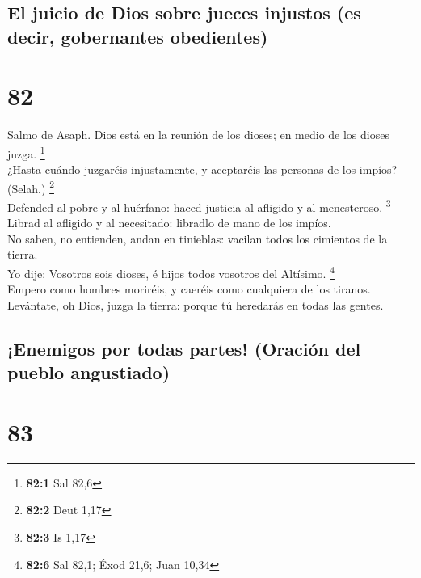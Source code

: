 \hypertarget{el-juicio-de-dios-sobre-jueces-injustos-es-decir-gobernantes-obedientes}{%
\subsection{El juicio de Dios sobre jueces injustos (es decir,
gobernantes
obedientes)}\label{el-juicio-de-dios-sobre-jueces-injustos-es-decir-gobernantes-obedientes}}

\hypertarget{section-81}{%
\section{82}\label{section-81}}

 Salmo de Asaph. Dios está en la reunión de los dioses; en
medio de los dioses juzga. \footnote{\textbf{82:1} Sal 82,6}\\
 ¿Hasta cuándo juzgaréis injustamente, y aceptaréis las
personas de los impíos? (Selah.) \footnote{\textbf{82:2} Deut 1,17}\\
 Defended al pobre y al huérfano: haced justicia al
afligido y al menesteroso. \footnote{\textbf{82:3} Is 1,17}\\
 Librad al afligido y al necesitado: libradlo de mano de
los impíos.\\
 No saben, no entienden, andan en tinieblas: vacilan todos
los cimientos de la tierra.\\
 Yo dije: Vosotros sois dioses, é hijos todos vosotros del
Altísimo. \footnote{\textbf{82:6} Sal 82,1; Éxod 21,6; Juan 10,34}\\
 Empero como hombres moriréis, y caeréis como cualquiera
de los tiranos.\\
 Levántate, oh Dios, juzga la tierra: porque tú heredarás
en todas las gentes.

\hypertarget{enemigos-por-todas-partes-oraciuxf3n-del-pueblo-angustiado}{%
\subsection{¡Enemigos por todas partes! (Oración del pueblo
angustiado)}\label{enemigos-por-todas-partes-oraciuxf3n-del-pueblo-angustiado}}

\hypertarget{section-82}{%
\section{83}\label{section-82}}

